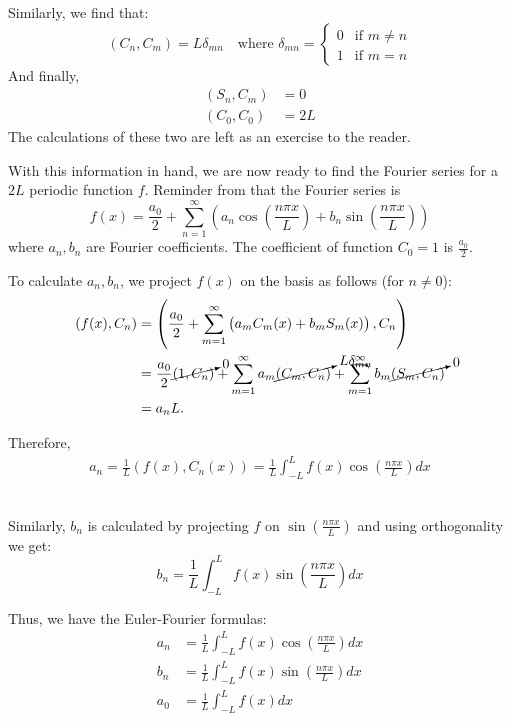 Similarly, we find that:
\[
(C_n, C_m) = L \delta_{mn} \quad \text{where } \delta_{mn} = \begin{cases}0 & \text{if } m \neq n \\ 1 & \text{if } m = n
\end{cases}
\]
And finally,
\begin{align*}
	(S_n, C_m) &= 0 \\
	(C_0, C_0) &= 2L
\end{align*}
The calculations of these two are left as an exercise to the reader.

With this information in hand, we are now ready to find the Fourier series for a $2L$ periodic function $f$. Reminder from  that the Fourier series is
\[
f(x) = \frac{a_0}{2} + \sum_{n=1}^{\infty} \left(a_n \cos{\left(\frac{n\pi x}{L}\right)} + b_n \sin{\left(\frac{n\pi x}{L}\right)}\right)
\]
where $a_n, b_n$ are Fourier coefficients. The coefficient of function $C_0 = 1$ is $\frac{a_0}{2}$.

To calculate $a_n, b_n$, we project $f(x)$ on the basis as follows (for $n \neq 0$): 
\begin{align*}
	(f(x), C_n) & = \left( \frac{a_0}{2} + \sum_{m=1}^{\infty} \left(a_m C_m(x) + b_m S_m(x) \right), C_n \right) \\
	& = \frac{a_0}{2}\cancelto{0}{(1,C_n)} + \sum_{m=1}^{\infty} a_m\cancelto{L\delta_{mn}}{(C_m, C_n)} + \sum_{m=1}^{\infty} b_m\cancelto{0}{(S_m, C_n)} \\
	&= a_n L.
\end{align*}

Therefore,
\begin{align*}
	a_n = \frac{1}{L} (f(x), C_n(x)) = \frac{1}{L} \int_{-L}^L f(x) \cos{\left(\frac{n \pi x}{L}\right)} dx
\end{align*}\

Similarly, $b_n$ is calculated by projecting $f$ on $\sin{\left( \frac{n \pi x}{L} \right)}$ and using orthogonality we get:
\[
b_n = \frac{1}{L} \int_{-L}^L f(x) \sin{\left( \frac{n \pi x}{L} \right)} dx
\]

Thus, we have the Euler-Fourier formulas:
\begin{align}
	\label{eq:eulerfourier1}
	a_n &= \frac{1}{L} \int_{-L}^L f(x) \cos{\left( \frac{n \pi x}{L} \right)} dx \\
	\label{eq:eulerfourier2}
	b_n &= \frac{1}{L} \int_{-L}^L f(x) \sin{\left( \frac{n \pi x}{L} \right)} dx \\
	\label{eq:eulerfourier3}
	a_0 &= \frac{1}{L} \int_{-L}^L f(x) dx
\end{align}

